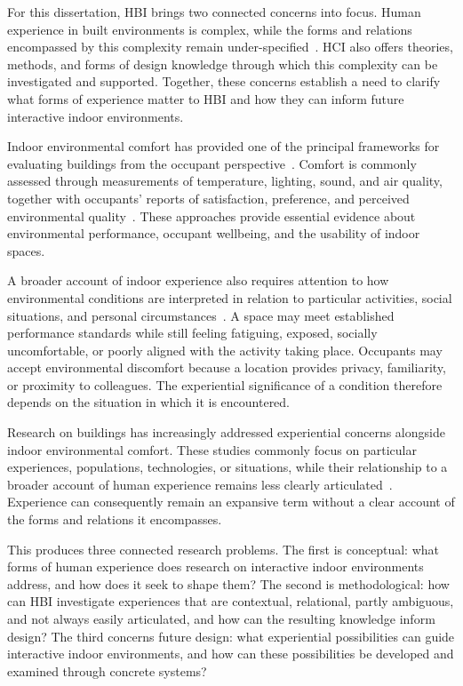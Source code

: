 For this dissertation, HBI brings two connected concerns into focus. Human experience in built environments is complex, while the forms and relations encompassed by this complexity remain under-specified~\cite{rao2025smart, rao2023towards}. HCI also offers theories, methods, and forms of design knowledge through which this complexity can be investigated and supported. Together, these concerns establish a need to clarify what forms of experience matter to HBI and how they can inform future interactive indoor environments.

Indoor environmental comfort has provided one of the principal frameworks for evaluating buildings from the occupant perspective~\cite{frontczak2011literature, alavi2017comfort}. Comfort is commonly assessed through measurements of temperature, lighting, sound, and air quality, together with occupants' reports of satisfaction, preference, and perceived environmental quality~\cite{alsafery2023sensing, zhang2012factors}. These approaches provide essential evidence about environmental performance, occupant wellbeing, and the usability of indoor spaces.

A broader account of indoor experience also requires attention to how environmental conditions are interpreted in relation to particular activities, social situations, and personal circumstances~\cite{clear2018thermokiosk, von2021towards, lorenzino2020acoustic}. A space may meet established performance standards while still feeling fatiguing, exposed, socially uncomfortable, or poorly aligned with the activity taking place. Occupants may accept environmental discomfort because a location provides privacy, familiarity, or proximity to colleagues\cite{rao2026emotion}. The experiential significance of a condition therefore depends on the situation in which it is encountered.

Research on buildings has increasingly addressed experiential concerns alongside indoor environmental comfort. These studies commonly focus on particular experiences, populations, technologies, or situations, while their relationship to a broader account of human experience remains less clearly articulated~\cite{rao2025smart}. Experience can consequently remain an expansive term without a clear account of the forms and relations it encompasses.

This produces three connected research problems. The first is conceptual: what forms of human experience does research on interactive indoor environments address, and how does it seek to shape them? The second is methodological: how can HBI investigate experiences that are contextual, relational, partly ambiguous, and not always easily articulated, and how can the resulting knowledge inform design? The third concerns future design: what experiential possibilities can guide interactive indoor environments, and how can these possibilities be developed and examined through concrete systems?

